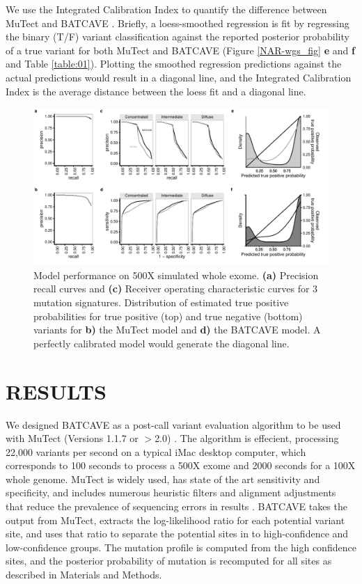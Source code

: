 \documentclass[a4,center,fleqn]{NAR}
\newcommand{\batcave}{BATCAVE }
\begin{document}
	We use the Integrated Calibration Index to quantify the difference between MuTect and \batcave \cite{Austin2019}.
	Briefly, a loess-smoothed regression is fit by regressing the binary (T/F) variant classification against the reported posterior probability of a true variant for both MuTect and \batcave (Figure \ref{NAR-wgs_fig} \textbf{e} and \textbf{f} and Table \ref{table:01}).
	Plotting the smoothed regression predictions against the actual predictions would result in a diagonal line, and the Integrated Calibration Index is the average distance between the loess fit and a diagonal line.

  \begin{figure}
    \begin{center}
    \includegraphics{figures/fig_wes.pdf}
    \end{center}
    \caption{Model performance on 500X simulated whole exome.
    \textbf{(a)} Precision recall curves and \textbf{(c)} Receiver operating characteristic curves for 3 mutation signatures.
    Distribution of estimated true positive probabilities for true positive (top) and true negative (bottom) variants for \textbf{b)} the MuTect model and \textbf{d)} the \batcave model.
    A perfectly calibrated model would generate the diagonal line.}
  \label{NAR-wes_fig}
  \end{figure}

\section{RESULTS}
We designed \batcave as a post-call variant evaluation algorithm to be used with MuTect (Versions 1.1.7 or $>$2.0) \cite{Cibulskis2013}.
The algorithm is effecient, processing 22,000 variants per second on a typical iMac desktop computer, which corresponds to 100 seconds to process a 500X exome and 2000 seconds for a 100X whole genome.
MuTect is widely used, has state of the art sensitivity and specificity, and includes numerous heuristic filters and alignment adjustments that reduce the prevalence of sequencing errors in results \cite{Griffith2015}.
\batcave takes the output from MuTect, extracts the log-likelihood ratio for each potential variant site, and uses that ratio to separate the potential sites in to high-confidence and low-confidence groups.
The mutation profile is computed from the high confidence sites, and the posterior probability of mutation is recomputed for all sites as described in Materials and Methods.
\end{document}
